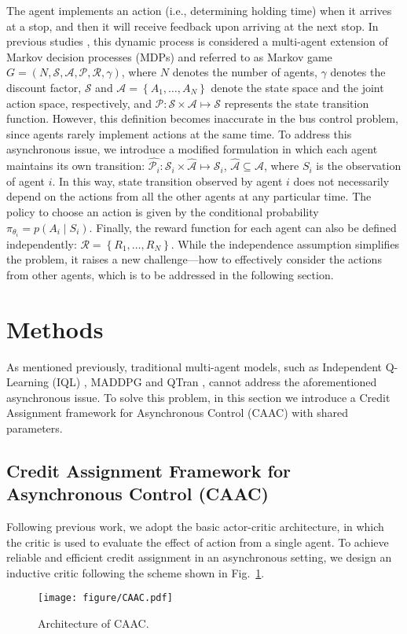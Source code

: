 \documentclass{article}
\begin{document}
The agent implements an action (i.e., determining holding time) when it arrives at a stop, and then it will receive feedback upon arriving at the next stop. In previous studies \cite{wang2020dynamic,chen2016real}, this dynamic process is considered a multi-agent extension of Markov decision processes (MDPs) \cite{littman1994markov} and referred to as Markov game $G=\left(N,\mathcal{S}, \mathcal{A},\mathcal{P}, \mathcal{R},{\gamma}\right)$, where $N$ denotes the number of agents, $\gamma$ denotes the discount factor, $\mathcal{S}$ and $\mathcal{A}=\left\{A_1,\ldots,A_N\right\}$ denote the state space and the joint action space, respectively, and $\mathcal{P}:\mathcal{S}\times\mathcal{A}\mapsto\mathcal{S}$ represents the state transition function. However, this definition becomes inaccurate in the bus control problem, since agents rarely implement actions at the same time. To address this asynchronous issue, we introduce a modified formulation in which each agent maintains its own transition: $\hat{\mathcal{P}_i}:\mathcal{S}_i\times\hat{\mathcal{A} }\mapsto\mathcal{S}_i$, $ \hat{\mathcal{A}} \subseteq \mathcal{A}$, where $S_i$ is the observation of agent $i$. In this way, state transition observed by agent $i$ does not necessarily depend on the actions from all the other agents at any particular time. The policy to choose an action is given by the conditional probability $\pi_{\theta_i}=p\left(A_i\mid S_i\right)$. Finally, the reward function for each agent can also be defined independently: $\mathcal{R}=\left\{R_1, \ldots,R_N\right\}$. While the independence assumption simplifies the problem, it raises a new challenge---how to effectively consider the actions from other agents, which is to be addressed in the following section.



\section{Methods}


As mentioned previously, traditional multi-agent models, such as Independent Q-Learning (IQL) \cite{tan1993multi}, MADDPG \cite{lowe2017multi} and QTran \cite{son2019qtran}, cannot address the aforementioned asynchronous issue. To solve this problem, in this section we introduce a Credit Assignment framework for Asynchronous Control (CAAC) with shared parameters.



\subsection{Credit Assignment Framework for Asynchronous Control (CAAC)}
Following previous work, we adopt the basic actor-critic architecture, in which the critic is used to evaluate the effect of action from a single agent. To achieve reliable and efficient credit assignment in an asynchronous setting, we design an inductive critic following the scheme shown in Fig.~\ref{fig:CAAC}.
\begin{figure}[!b]
\centering
     \texttt{[image: figure/CAAC.pdf]}
  \caption{Architecture of CAAC.}
   \label{fig:CAAC}
\end{figure}
\end{document}
